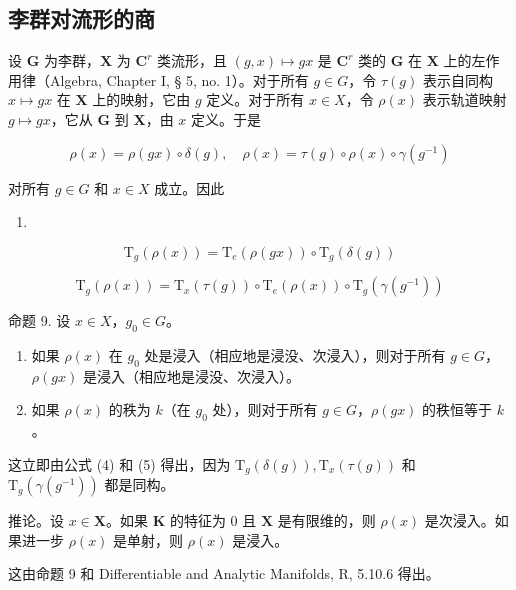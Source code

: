 \subsection{李群对流形的商}

设 \(\mathbf{G}\) 为李群，\(\mathbf{X}\) 为 \(\mathbf{C}^r\) 类流形，且 \((g,x)\mapsto gx\) 是 \(\mathbf{C}^r\) 类的 \(\mathbf{G}\) 在 \(\mathbf{X}\) 上的左作用律（Algebra, Chapter I, § 5, no. 1）。对于所有 \(g\in G\)，令 \(\tau (g)\) 表示自同构 \(x\mapsto gx\) 在 \(\mathbf{X}\) 上的映射，它由 \(g\) 定义。对于所有 \(x\in X\)，令 \(\rho (x)\) 表示轨道映射 \(g\mapsto gx\)，它从 \(\mathbf{G}\) 到 \(\mathbf{X}\)，由 \(x\) 定义。于是

\[
\rho (x) = \rho (g x) \circ \delta (g), \quad \rho (x) = \tau (g) \circ \rho (x) \circ \gamma (g ^ {- 1})\tag{3}
\]

对所有 \(g\in G\) 和 \(x\in X\) 成立。因此

\begin{enumerate}
\def\labelenumi{(\arabic{enumi})}
\setcounter{enumi}{3}
\tightlist
\item
\end{enumerate}

\[
\mathrm{T} _ {g} (\rho (x)) = \mathrm{T} _ {e} (\rho (g x)) \circ \mathrm{T} _ {g} (\delta (g))
\]

\[
\mathrm{T} _ {g} (\rho (x)) = \mathrm{T} _ {x} (\tau (g)) \circ \mathrm{T} _ {e} (\rho (x)) \circ \mathrm{T} _ {g} (\gamma (g ^ {- 1}))\tag{5}
\]

命题 9. 设 \(x \in X\)，\(g_0 \in G\)。

\begin{enumerate}
\def\labelenumi{(\roman{enumi})}
\item
  如果 \(\rho(x)\) 在 \(g_0\) 处是浸入（相应地是浸没、次浸入），则对于所有 \(g \in G\)，\(\rho(gx)\) 是浸入（相应地是浸没、次浸入）。
\item
  如果 \(\rho(x)\) 的秩为 \(k\)（在 \(g_0\) 处），则对于所有 \(g \in G\)，\(\rho(gx)\) 的秩恒等于 \(k\)。
\end{enumerate}

这立即由公式 (4) 和 (5) 得出，因为 \(\mathrm{T}_{g}(\delta(g)),\mathrm{T}_{x}(\tau(g))\) 和 \(\mathrm{T}_{g}(\gamma(g^{-1}))\) 都是同构。

推论。设 \(x \in \mathbf{X}\)。如果 \(\mathbf{K}\) 的特征为 0 且 \(\mathbf{X}\) 是有限维的，则 \(\rho(x)\) 是次浸入。如果进一步 \(\rho(x)\) 是单射，则 \(\rho(x)\) 是浸入。

这由命题 9 和 Differentiable and Analytic Manifolds, R, 5.10.6 得出。

